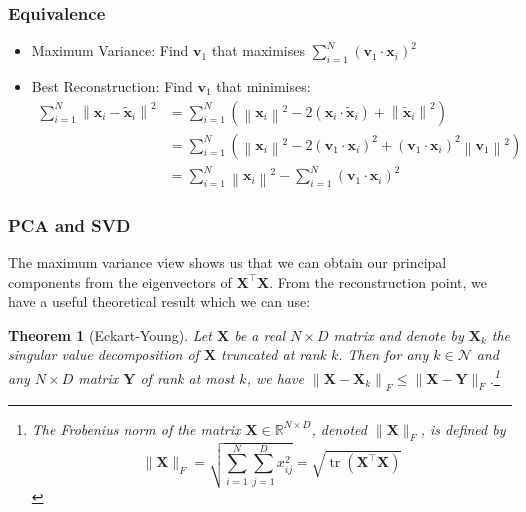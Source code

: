 \documentclass[11pt, %
	oneside, %
	english, %
	onehalfspacing, %
	parskip, %
	]{article} %
\newtheorem{theorem}{Theorem}
\theoremstyle{definition}
\begin{document}
\subsubsection*{Equivalence}

\begin{itemize}
	\item Maximum Variance: Find $\mathbf{v}_1$ that maximises $\sum_{i=1}^N\left(\mathbf{v}_1 \cdot \mathbf{x}_i\right)^2$
	\item Best Reconstruction: Find $\mathbf{v}_1$ that minimises:
	$$
	\begin{aligned}
	\sum_{i=1}^N\left\|\mathbf{x}_i-\tilde{\mathbf{x}}_i\right\|^2 & =\sum_{i=1}^N\left(\left\|\mathbf{x}_i\right\|^2-2\left(\mathbf{x}_i \cdot \tilde{\mathbf{x}}_i\right)+\left\|\tilde{\mathbf{x}}_i\right\|^2\right) \\
	& =\sum_{i=1}^N\left(\left\|\mathbf{x}_i\right\|^2-2\left(\mathbf{v}_1 \cdot \mathbf{x}_i\right)^2+\left(\mathbf{v}_1 \cdot \mathbf{x}_i\right)^2\left\|\mathbf{v}_1\right\|^2\right) \\
	& =\sum_{i=1}^N\left\|\mathbf{x}_i\right\|^2-\sum_{i=1}^N\left(\mathbf{v}_1 \cdot \mathbf{x}_i\right)^2
	\end{aligned}
	$$
\end{itemize}

\subsubsection*{PCA and SVD}

The maximum variance view shows us that we can obtain our principal components from the eigenvectors of $\mathbf{X}^\top \mathbf{X}$. From the reconstruction point, we have a useful theoretical result which we can use:

\begin{theorem}[Eckart-Young]
	Let $\mathbf{X}$ be a real $N \times D$ matrix and denote by $\mathbf{X}_k$ the singular value decomposition of $\mathbf{X}$ truncated at rank $k$. Then for any $k \in \mathcal{N}$ and any $N \times D$ matrix $\mathbf{Y}$ of rank at most $k$, we have $\left\|\mathbf{X}-\mathbf{X}_k\right\|_F \leq\|\mathbf{X}-\mathbf{Y}\|_F$.\footnote{The Frobenius norm of the matrix $\mathbf{X} \in \mathbb{R}^{N \times D}$, denoted $\|\mathbf{X}\|_F$, is defined by
	 $$
	 \|\mathbf{X}\|_F=\sqrt{\sum_{i=1}^N \sum_{j=1}^D x_{i j}^2}=\sqrt{\operatorname{tr}\left(\mathbf{X}^{\top} \mathbf{X}\right)}
	 $$
	 }
\end{theorem}
\end{document}
